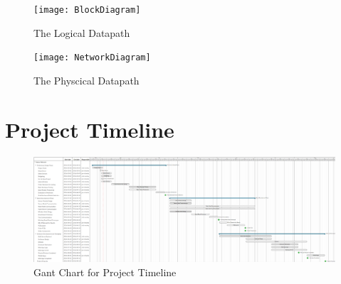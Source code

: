 		\begin{figure}[h!]
			\centering
			\texttt{[image: BlockDiagram]}
			\caption{The Logical Datapath}
			\label{fig:BlockDiagram}
		\end{figure}
		
		\clearpage
		
		\begin{figure}[h!]
			\centering
			\texttt{[image: NetworkDiagram]}
			\caption{The Physcical Datapath}
			\label{fig:NetworkDiagram}
		\end{figure}
		
		\clearpage
		 
	\section{Project Timeline}
	
		\begin{figure}[h!]
			\centering
			\includegraphics[width=0.85\textheight, angle=90]{GantChart}
			\caption{Gant Chart for Project Timeline}
			\label{fig:NetworkDiagram}
		\end{figure}
		 
